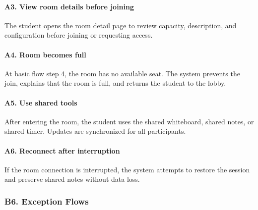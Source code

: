\documentclass[12pt]{article}
\begin{document}
\hypertarget{sec:a3-view-room-details-before-joining}{}
\paragraph*{A3. View room details before joining}
\par\medskip

The student opens the room detail page to review capacity, description, and configuration before joining or requesting access.
\par\medskip

\hypertarget{sec:a4-room-becomes-full}{}
\paragraph*{A4. Room becomes full}
\par\medskip

At basic flow step 4, the room has no available seat. The system prevents the join, explains that the room is full, and returns the student to the lobby.
\par\medskip

\hypertarget{sec:a5-use-shared-tools}{}
\paragraph*{A5. Use shared tools}
\par\medskip

After entering the room, the student uses the shared whiteboard, shared notes, or shared timer. Updates are synchronized for all participants.
\par\medskip

\hypertarget{sec:a6-reconnect-after-interruption}{}
\paragraph*{A6. Reconnect after interruption}
\par\medskip

If the room connection is interrupted, the system attempts to restore the session and preserve shared notes without data loss.
\par\medskip

\hypertarget{sec:b6-exception-flows}{}
\subsubsection*{B6. Exception Flows}
\par\medskip
\end{document}
